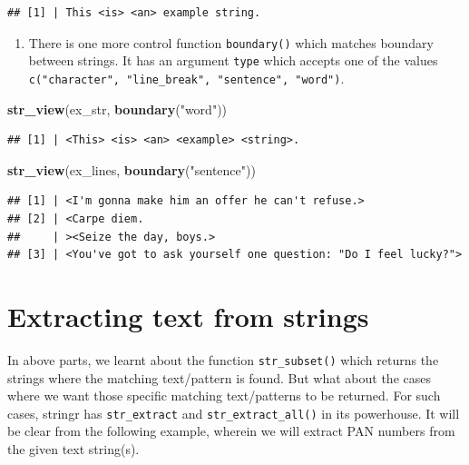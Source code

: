 \documentclass[
]{book}
\newenvironment{Shaded}{\begin{snugshade}}{\end{snugshade}}
\newcommand{\FunctionTok}[1]{\textcolor[rgb]{0.13,0.29,0.53}{\textbf{#1}}}
\newcommand{\NormalTok}[1]{#1}
\newcommand{\StringTok}[1]{\textcolor[rgb]{0.31,0.60,0.02}{#1}}
\providecommand{\tightlist}{%
  \setlength{\itemsep}{0pt}\setlength{\parskip}{0pt}}
\begin{document}
\begin{verbatim}
## [1] | This <is> <an> example string.
\end{verbatim}

\begin{enumerate}
\def\labelenumi{\arabic{enumi}.}
\setcounter{enumi}{2}
\tightlist
\item
  There is one more control function \texttt{boundary()} which matches boundary between strings. It has an argument \texttt{type} which accepts one of the values \texttt{c("character",\ "line\_break",\ "sentence",\ "word")}.
\end{enumerate}

\begin{Shaded}
\begin{Highlighting}[]
\FunctionTok{str\_view}\NormalTok{(ex\_str, }\FunctionTok{boundary}\NormalTok{(}\StringTok{"word"}\NormalTok{))}
\end{Highlighting}
\end{Shaded}

\begin{verbatim}
## [1] | <This> <is> <an> <example> <string>.
\end{verbatim}

\begin{Shaded}
\begin{Highlighting}[]
\FunctionTok{str\_view}\NormalTok{(ex\_lines, }\FunctionTok{boundary}\NormalTok{(}\StringTok{"sentence"}\NormalTok{))}
\end{Highlighting}
\end{Shaded}

\begin{verbatim}
## [1] | <I'm gonna make him an offer he can't refuse.>
## [2] | <Carpe diem.
##     | ><Seize the day, boys.>
## [3] | <You've got to ask yourself one question: "Do I feel lucky?">
\end{verbatim}

\hypertarget{extracting-text-from-strings}{%
\section{Extracting text from strings}\label{extracting-text-from-strings}}

In above parts, we learnt about the function \texttt{str\_subset()} which returns the strings where the matching text/pattern is found. But what about the cases where we want those specific matching text/patterns to be returned. For such cases, stringr has \texttt{str\_extract} and \texttt{str\_extract\_all()} in its powerhouse. It will be clear from the following example, wherein we will extract PAN numbers from the given text string(s).
\end{document}
